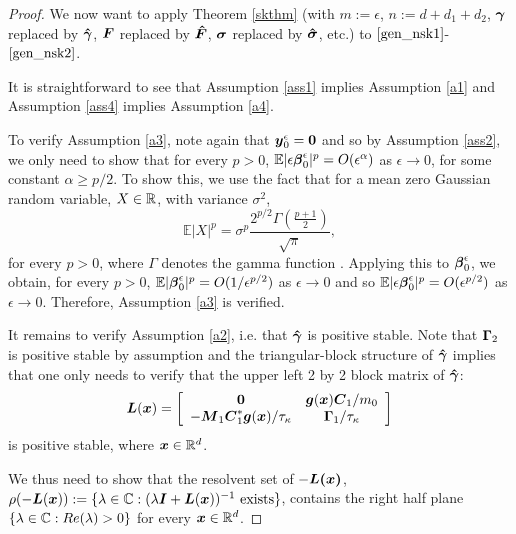\begin{proof}
We now want to apply Theorem \ref{skthm} (with $m:=\epsilon$, $n:=d+d_1+d_2$, $\boldsymbol{\gamma}$ replaced by $\boldsymbol{\hat{\gamma}}$, $\boldsymbol{F}$ replaced by $\boldsymbol{\hat{F}}$, $\boldsymbol{\sigma}$ replaced by $\boldsymbol{\hat{\sigma}}$, etc.)  to $\eqref{gen_nsk1}$-$\eqref{gen_nsk2}$. 

It is straightforward to see that Assumption \ref{ass1} implies Assumption \ref{a1} and Assumption \ref{ass4} implies Assumption \ref{a4}. 

To verify Assumption \ref{a3}, note again that $\boldsymbol{y}^\epsilon_0 = \boldsymbol{0}$ and so by Assumption \ref{ass2}, we only need to show that for every $p>0$, $\mathbb{E}|\epsilon \boldsymbol{\beta}^\epsilon_0|^p = O(\epsilon^\alpha)$ as $\epsilon \to 0$, for some constant $\alpha \geq p/2$. To show this, we use the fact that for a mean zero Gaussian random variable, $X \in \mathbb{R}$, with variance $\sigma^2$,
\begin{equation}
\mathbb{E} |X|^p = \sigma^p \frac{2^{p/2} \Gamma\left(\frac{p+1}{2}\right)}{\sqrt{\pi}},
\end{equation}
for every $p>0$, where $\Gamma$ denotes the gamma function \cite{winkelbauer2012moments}. Applying this to $\boldsymbol{\beta}^\epsilon_0$, we obtain, for every $p>0$, $\mathbb{E} |\boldsymbol{\beta}_0^\epsilon|^p = O(1/\epsilon^{p/2})$ as $\epsilon \to 0$  and so $\mathbb{E}|\epsilon \boldsymbol{\beta}_0^\epsilon|^p = O(\epsilon^{p/2})$ as $\epsilon \to 0$.  Therefore, Assumption \ref{a3} is verified. 

It remains to verify Assumption \ref{a2}, i.e. that $\boldsymbol{\hat{\gamma}}$ is positive stable. Note that $\boldsymbol{\Gamma}_2$ is positive stable by assumption and the triangular-block structure of $\boldsymbol{\hat{\gamma}}$ implies that one only needs to verify that the upper left 2 by 2 block matrix of $\boldsymbol{\hat{\gamma}}$:
\begin{equation}
\boldsymbol{L}(\boldsymbol{x}) = \left[ \begin{array}{cc}
 \boldsymbol{0} & \boldsymbol{g}(\boldsymbol{x}) \boldsymbol{C}_1/m_0   \\
-\boldsymbol{M}_1 \boldsymbol{C}_1^* \boldsymbol{g}(\boldsymbol{x})/\tau_{\kappa}  & \boldsymbol{\Gamma}_1/\tau_{\kappa}  \end{array} \right]\end{equation}
 is positive stable, where $\boldsymbol{x} \in \mathbb{R}^d$. 

We thus need to show that the resolvent set of $-\boldsymbol{L(\boldsymbol{x})}$,  $\rho(-\boldsymbol{L}(\boldsymbol{x})):=\{\lambda \in \mathbb{C} : (\lambda \boldsymbol{I} + \boldsymbol{L}(\boldsymbol{x}))^{-1} \text{ exists}\}$, contains the right half plane $\{\lambda \in \mathbb{C} : Re(\lambda)>0\}$ for every $\boldsymbol{x} \in \mathbb{R}^d$.


\end{proof}

